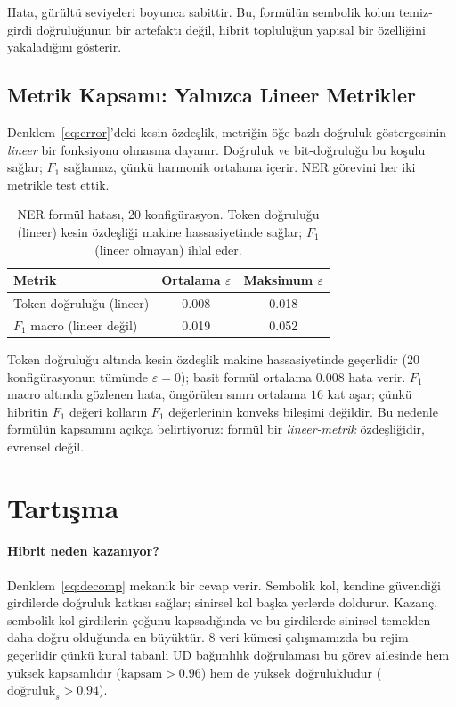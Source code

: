 \documentclass[11pt,a4paper]{article}
\begin{document}
Hata, gürültü seviyeleri boyunca sabittir. Bu, formülün sembolik kolun
temiz-girdi doğruluğunun bir artefaktı değil, hibrit topluluğun
yapısal bir özelliğini yakaladığını gösterir.


\subsection{Metrik Kapsamı: Yalnızca Lineer Metrikler}
\label{sec:metric-scope-tr}

Denklem~\ref{eq:error}'deki kesin özdeşlik, metriğin öğe-bazlı
doğruluk göstergesinin \emph{lineer} bir fonksiyonu olmasına dayanır.
Doğruluk ve bit-doğruluğu bu koşulu sağlar; $F_1$ sağlamaz, çünkü
harmonik ortalama içerir. NER görevini her iki metrikle test ettik.

\begin{table}[ht]
\centering
\caption{NER formül hatası, 20 konfigürasyon. Token doğruluğu
(lineer) kesin özdeşliği makine hassasiyetinde sağlar; $F_1$
(lineer olmayan) ihlal eder.}
\label{tab:metric-scope-tr}
\small
\begin{tabular}{lcc}
\toprule
Metrik & Ortalama $\varepsilon$ & Maksimum $\varepsilon$ \\
\midrule
Token doğruluğu (lineer)   & 0.008 & 0.018 \\
$F_1$ macro (lineer değil) & 0.019 & 0.052 \\
\bottomrule
\end{tabular}
\end{table}

Token doğruluğu altında kesin özdeşlik makine hassasiyetinde geçerlidir
(20 konfigürasyonun tümünde $\varepsilon = 0$); basit formül ortalama
$0.008$ hata verir. $F_1$ macro altında gözlenen hata, öngörülen sınırı
ortalama $16$ kat aşar; çünkü hibritin $F_1$ değeri kolların $F_1$
değerlerinin konveks bileşimi değildir. Bu nedenle formülün kapsamını
açıkça belirtiyoruz: formül bir \emph{lineer-metrik} özdeşliğidir,
evrensel değil.

\section{Tartışma}
\label{sec:tartisma}

\paragraph{Hibrit neden kazanıyor?}
Denklem~\ref{eq:decomp} mekanik bir cevap verir. Sembolik kol, kendine
güvendiği girdilerde doğruluk katkısı sağlar; sinirsel kol başka
yerlerde doldurur. Kazanç, sembolik kol girdilerin çoğunu kapsadığında
ve bu girdilerde sinirsel temelden daha doğru olduğunda en büyüktür.
8 veri kümesi çalışmamızda bu rejim geçerlidir çünkü kural tabanlı UD
bağımlılık doğrulaması bu görev ailesinde hem yüksek kapsamlıdır
($\text{kapsam} > 0.96$) hem de yüksek doğrulukludur
($\text{doğruluk}_s > 0.94$).
\end{document}
